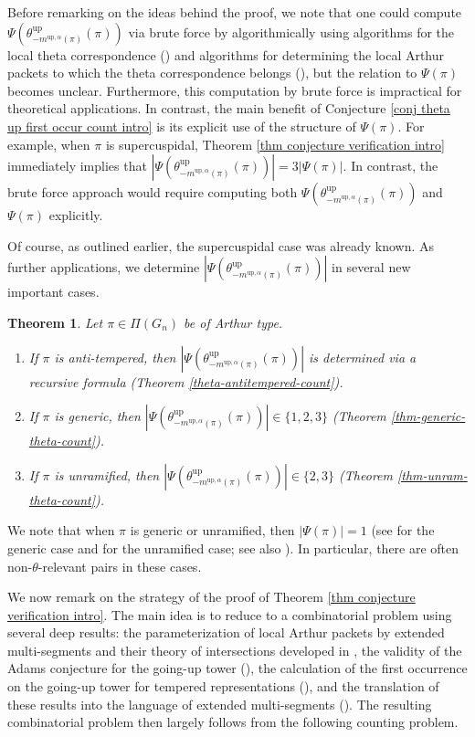 \documentclass[11pt,letterpaper]{amsart}
\newcommand{\up}{{\mathrm{up}}}
\newtheorem{thm}{Theorem}[section]
\numberwithin{equation}{section}
\begin{document}
Before remarking on the ideas behind the proof, we note that one could compute $\Psi(\theta_{-m^{\up, \alpha}(\pi)}^\up(\pi))$ via brute force by algorithmically using algorithms for the local theta correspondence (\cite{AG17a,BH22}) and algorithms for determining the local Arthur packets to which the theta correspondence belongs (\cite{HLL25}), but the relation to $\Psi(\pi)$ becomes unclear. Furthermore, this computation by brute force is impractical for theoretical applications. In contrast, the main benefit of
Conjecture \ref{conj theta up first occur count intro} is its explicit use of the structure of $\Psi(\pi)$. For example, when $\pi$ is supercuspidal, Theorem \ref{thm conjecture verification intro} immediately implies that $|\Psi(\theta_{-m^{\up, \alpha}(\pi)}^\up(\pi))|=3|\Psi(\pi)|$. In contrast, the brute force approach would require computing both $\Psi(\theta_{-m^{\up, \alpha}(\pi)}^\up(\pi))$ and $\Psi(\pi)$ explicitly.

Of course, as outlined earlier, the supercuspidal case was already known. As further applications, we determine  $|\Psi(\theta_{-m^{\up, \alpha}(\pi)}^\up(\pi))|$ in several new important cases.

\begin{thm}
    Let $\pi\in\Pi(G_n)$ be of Arthur type.
    \begin{enumerate}
        \item If $\pi$ is anti-tempered, then $|\Psi(\theta_{-m^{\up, \alpha}(\pi)}^\up(\pi))|$ is determined via a recursive formula (Theorem \ref{theta-antitempered-count}).
        \item If $\pi$ is generic, then $|\Psi(\theta_{-m^{\up, \alpha}(\pi)}^\up(\pi))|\in\{1,2,3\}$ (Theorem \ref{thm-generic-theta-count}).
        \item If $\pi$ is unramified, then $|\Psi(\theta_{-m^{\up, \alpha}(\pi)}^\up(\pi))|\in\{2,3\}$ (Theorem \ref{thm-unram-theta-count}).
    \end{enumerate}
\end{thm}

We note that when $\pi$ is generic or unramified, then $|\Psi(\pi)|=1$ (see \cite[Theorem 1.2]{HLL24} for the generic case and \cite[Proposition 6.4]{Moe09b} for the unramified case; see also \cite[Proposition 5.5]{HLL24}). In particular, there are often non-$\theta$-relevant pairs in these cases.

We now remark on the strategy of the proof of Theorem \ref{thm conjecture verification intro}. The main idea is to reduce to a combinatorial problem using several deep results: the parameterization of local Arthur packets by extended multi-segments and their theory of intersections developed in \cite{Ato20b, HLL22, HLL25}, the validity of the Adams conjecture for the going-up tower (\cite{BH22, Moe11c}), the calculation of the first occurrence on the going-up tower for tempered representations (\cite{AG17b}), and the translation of these results into the language of extended multi-segments (\cite{HLL25}). The resulting combinatorial problem then largely follows from the following counting problem. 
\end{document}
